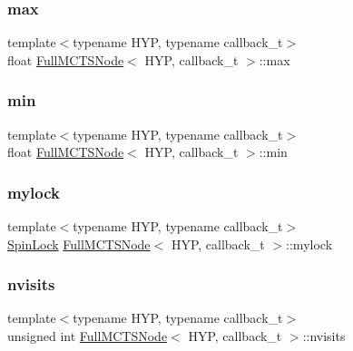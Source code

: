 \subsubsection{\texorpdfstring{max}{max}}
{\footnotesize\ttfamily template$<$typename H\+YP, typename callback\+\_\+t$>$ \\
float \hyperlink{class_full_m_c_t_s_node}{Full\+M\+C\+T\+S\+Node}$<$ H\+YP, callback\+\_\+t $>$\+::max}

\mbox{\label{class_full_m_c_t_s_node_a5d5e323a0ece2d29eff487b2d60a7e3f}} 
\subsubsection{\texorpdfstring{min}{min}}
{\footnotesize\ttfamily template$<$typename H\+YP, typename callback\+\_\+t$>$ \\
float \hyperlink{class_full_m_c_t_s_node}{Full\+M\+C\+T\+S\+Node}$<$ H\+YP, callback\+\_\+t $>$\+::min}

\mbox{\label{class_full_m_c_t_s_node_a01c6d7375326e6e6f51cd1a8173d52d2}} 
\subsubsection{\texorpdfstring{mylock}{mylock}}
{\footnotesize\ttfamily template$<$typename H\+YP, typename callback\+\_\+t$>$ \\
\hyperlink{class_spin_lock}{Spin\+Lock} \hyperlink{class_full_m_c_t_s_node}{Full\+M\+C\+T\+S\+Node}$<$ H\+YP, callback\+\_\+t $>$\+::mylock}

\mbox{\label{class_full_m_c_t_s_node_a147985f7b1fdf0b3340d95192ff3cc57}} 
\subsubsection{\texorpdfstring{nvisits}{nvisits}}
{\footnotesize\ttfamily template$<$typename H\+YP, typename callback\+\_\+t$>$ \\
unsigned int \hyperlink{class_full_m_c_t_s_node}{Full\+M\+C\+T\+S\+Node}$<$ H\+YP, callback\+\_\+t $>$\+::nvisits}

